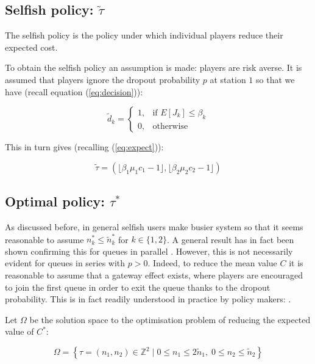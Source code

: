 \documentclass[12pt]{article}
\begin{document}
\subsection{Selfish policy: $\tilde \tau$}

The selfish policy is the policy under which individual players reduce their expected cost.

To obtain the selfish policy an assumption is made: players are risk averse.
It is assumed that players ignore the dropout probability $p$ at station $1$ so that we have (recall equation (\ref{eq:decision})):

\begin{equation}\label{eq:selfishdecision}
    \tilde d_k=
\begin{cases}
    1,& \text{if } E[J_k] \leq \beta_k \\
    0,& \text{otherwise}
\end{cases}
\end{equation}

This in turn gives (recalling (\ref{eq:expect})):

\begin{equation}\label{eq:selfishpolicy}
\tilde\tau = \left(\lfloor\beta_1\mu_1 c_1 - 1\rfloor,\lfloor\beta_2\mu_2 c_2 - 1\rfloor\right)
\end{equation}


\subsection{Optimal policy: $\tau ^*$}

As discussed before, in general selfish users make busier system so that it seems reasonable to assume $n_k^*\leq \tilde n_k^*$ for $k\in\{1,2\}$.
A general result has in fact been shown confirming this for queues in parallel \cite{shone2014containment}.
However, this is not necessarily evident for queues in series with $p>0$.
Indeed, to reduce the mean value $C$ it is reasonable to assume that a gateway effect exists, where players are encouraged to join the first queue in order to exit the queue thanks to the dropout probability.
This is in fact readily understood in practice by policy makers: \cite{Mail_millions}.

Let $\Omega$ be the solution space to the optimisation problem of reducing the expected value of $C^*$:

\begin{equation}\label{searchspace}
\Omega = \left\{\tau=(n_1, n_2)\in\mathbb{Z}^2\;|\;0\leq n_1\leq 2\tilde n_1,\; 0\leq n_2\leq \tilde n_2 \right\}
\end{equation}
\end{document}
